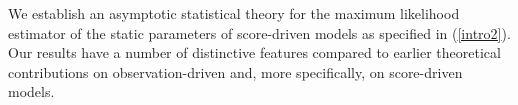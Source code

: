 We establish an asymptotic statistical theory for the maximum likelihood estimator of the static parameters of score-driven models as specified in (\ref{intro2}). 
Our results have a number of distinctive features compared to earlier theoretical contributions on observation-driven and, more specifically, on score-driven models.




